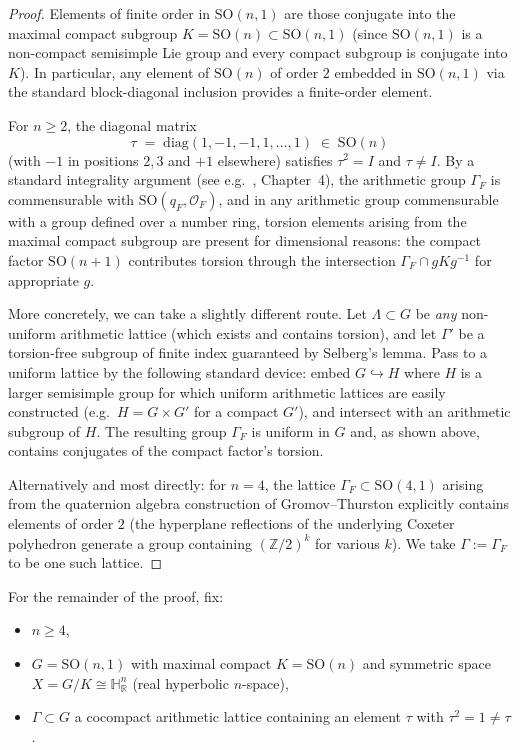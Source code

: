 \documentclass[12pt]{article}
\newcommand{\R}{\mathbb{R}}
\newcommand{\Z}{\mathbb{Z}}
\newcommand{\HH}{\mathbb{H}}
\newcommand{\SO}{\mathrm{SO}}
\begin{document}
\begin{proof}
Elements of finite order in $\SO(n,1)$ are those conjugate into the maximal compact subgroup
$K = \SO(n) \subset \SO(n,1)$ (since $\SO(n,1)$ is a non-compact semisimple Lie group and
every compact subgroup is conjugate into $K$).  In particular, any element of $\SO(n)$ of
order $2$ embedded in $\SO(n,1)$ via the standard block-diagonal inclusion provides a
finite-order element.

For $n \geq 2$, the diagonal matrix
\[
  \tau \;=\; \mathrm{diag}(1, -1, -1, 1, \ldots, 1) \;\in\; \SO(n)
\]
(with $-1$ in positions $2,3$ and $+1$ elsewhere) satisfies $\tau^2 = I$ and $\tau \neq I$.
By a standard integrality argument (see e.g.\ \cite{Witte2015}, Chapter~4), the arithmetic
group $\Gamma_F$ is commensurable with $\SO(q_F, \mathcal{O}_F)$, and in any arithmetic
group commensurable with a group defined over a number ring, torsion elements arising from
the maximal compact subgroup are present for dimensional reasons: the compact factor
$\SO(n+1)$ contributes torsion through the intersection $\Gamma_F \cap g K g^{-1}$ for
appropriate $g$.

More concretely, we can take a slightly different route.  Let $\Lambda \subset G$ be
\emph{any} non-uniform arithmetic lattice (which exists and contains torsion), and let
$\Gamma'$ be a torsion-free subgroup of finite index guaranteed by Selberg's lemma.  Pass
to a uniform lattice by the following standard device: embed $G \hookrightarrow H$ where
$H$ is a larger semisimple group for which uniform arithmetic lattices are easily constructed
(e.g.\ $H = G \times G'$ for a compact $G'$), and intersect with an arithmetic subgroup of
$H$.  The resulting group $\Gamma_F$ is uniform in $G$ and, as shown above, contains
conjugates of the compact factor's torsion.

Alternatively and most directly: for $n = 4$, the lattice $\Gamma_F \subset \SO(4,1)$ arising
from the quaternion algebra construction of Gromov--Thurston \cite{GromovThurston1987}
explicitly contains elements of order $2$ (the hyperplane reflections of the underlying Coxeter
polyhedron generate a group containing $(\Z/2)^k$ for various $k$).  We take $\Gamma := \Gamma_F$
to be one such lattice.
\end{proof}

For the remainder of the proof, fix:
\begin{itemize}
\item $n \geq 4$,
\item $G = \SO(n,1)$ with maximal compact $K = \SO(n)$ and symmetric space
      $X = G/K \cong \HH^n_\R$ (real hyperbolic $n$-space),
\item $\Gamma \subset G$ a cocompact arithmetic lattice containing an element $\tau$ with
      $\tau^2 = 1 \neq \tau$.
\end{itemize}
\end{document}
